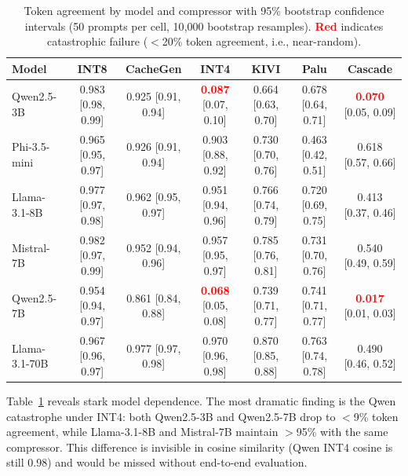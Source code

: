 \documentclass{article}
\begin{document}
\begin{table}[t]
\centering
\caption{Token agreement by model and compressor with 95\% bootstrap confidence intervals (50 prompts per cell, 10{,}000 bootstrap resamples). \textcolor{red}{\textbf{Red}} indicates catastrophic failure ($<$20\% token agreement, i.e., near-random).}
\label{tab:model_sensitivity}
\small
\begin{tabular}{lcccccc}
\toprule
\textbf{Model} & \textbf{INT8} & \textbf{CacheGen} & \textbf{INT4} & \textbf{KIVI} & \textbf{Palu} & \textbf{Cascade} \\
\midrule
Qwen2.5-3B & 0.983 {\tiny [0.98, 0.99]} & 0.925 {\tiny [0.91, 0.94]} & \textcolor{red}{\textbf{0.087}} {\tiny [0.07, 0.10]} & 0.664 {\tiny [0.63, 0.70]} & 0.678 {\tiny [0.64, 0.71]} & \textcolor{red}{\textbf{0.070}} {\tiny [0.05, 0.09]} \\
Phi-3.5-mini & 0.965 {\tiny [0.95, 0.97]} & 0.926 {\tiny [0.91, 0.94]} & 0.903 {\tiny [0.88, 0.92]} & 0.730 {\tiny [0.70, 0.76]} & 0.463 {\tiny [0.42, 0.51]} & 0.618 {\tiny [0.57, 0.66]} \\
Llama-3.1-8B & 0.977 {\tiny [0.97, 0.98]} & 0.962 {\tiny [0.95, 0.97]} & 0.951 {\tiny [0.94, 0.96]} & 0.766 {\tiny [0.74, 0.79]} & 0.720 {\tiny [0.69, 0.75]} & 0.413 {\tiny [0.37, 0.46]} \\
Mistral-7B & 0.982 {\tiny [0.97, 0.99]} & 0.952 {\tiny [0.94, 0.96]} & 0.957 {\tiny [0.95, 0.97]} & 0.785 {\tiny [0.76, 0.81]} & 0.731 {\tiny [0.70, 0.76]} & 0.540 {\tiny [0.49, 0.59]} \\
Qwen2.5-7B & 0.954 {\tiny [0.94, 0.97]} & 0.861 {\tiny [0.84, 0.88]} & \textcolor{red}{\textbf{0.068}} {\tiny [0.05, 0.08]} & 0.739 {\tiny [0.71, 0.77]} & 0.741 {\tiny [0.71, 0.77]} & \textcolor{red}{\textbf{0.017}} {\tiny [0.01, 0.03]} \\
\midrule
Llama-3.1-70B & 0.967 {\tiny [0.96, 0.97]} & 0.977 {\tiny [0.97, 0.98]} & 0.970 {\tiny [0.96, 0.98]} & 0.870 {\tiny [0.85, 0.88]} & 0.763 {\tiny [0.74, 0.78]} & 0.490 {\tiny [0.46, 0.52]} \\
\bottomrule
\end{tabular}
\end{table}

Table~\ref{tab:model_sensitivity} reveals stark model dependence. The most dramatic finding is the Qwen catastrophe under INT4: both Qwen2.5-3B and Qwen2.5-7B drop to $<$9\% token agreement, while Llama-3.1-8B and Mistral-7B maintain $>$95\% with the same compressor. This difference is invisible in cosine similarity (Qwen INT4 cosine is still 0.98) and would be missed without end-to-end evaluation.
\end{document}
